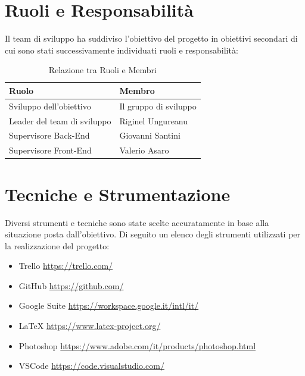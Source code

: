 \documentclass{report}
\begin{document}

\chapter{Ruoli e Responsabilità}
Il team di sviluppo ha suddiviso l’obiettivo del progetto in obiettivi secondari di cui sono stati successivamente individuati ruoli e responsabilità:

\begin{table}[!ht]
	\begin{center} %
		\centering
		\begin{tabular}{ |p{4cm}|p{4cm}|  }
			\hline
			\centering Ruolo & \qquad\qquad Membro \\ %
			\hline
			Sviluppo dell'obiettivo & Il gruppo di sviluppo \\
			\hline
			Leader del team di sviluppo & Riginel Ungureanu \\
			\hline
			Supervisore Back-End &
			Giovanni Santini \\
			\hline
			Supervisore Front-End & Valerio Asaro\\
			\hline
		\end{tabular}
		\caption{Relazione tra Ruoli e Membri}
	\end{center}
\end{table}


\chapter{Tecniche e Strumentazione}
Diversi strumenti e tecniche sono state scelte accuratamente in base alla situazione posta dall’obiettivo. Di seguito un elenco degli strumenti utilizzati per la realizzazione del progetto:

\begin{itemize}
	\item Trello \qquad \url{https://trello.com/}
	\item GitHub \qquad \url{https://github.com/}
	\item Google Suite \qquad \url{https://workspace.google.it/intl/it/}
	\item LaTeX \qquad \url{https://www.latex-project.org/}
	\item Photoshop \qquad \url{https://www.adobe.com/it/products/photoshop.html}
	\item VSCode \qquad \url{https://code.visualstudio.com/}
\end{itemize}
\end{document}

